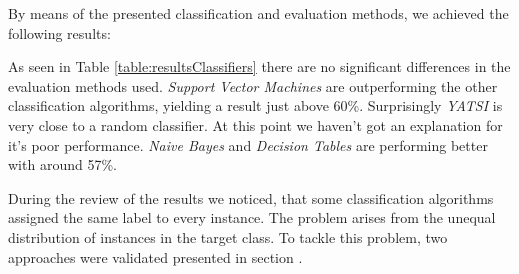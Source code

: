 By means of the presented classification and evaluation methods, we achieved the following results:
\begin{table}[h]
\label{table:resultsClassifiers}
\end{table}


As seen in Table \ref{table:resultsClassifiers} there are no significant differences in the evaluation methods used. 
\textit{Support Vector Machines} are outperforming the other classification algorithms, yielding a result just above 
60\%. Surprisingly \textit{YATSI} is very close to a random classifier. At this point we haven't got an explanation for 
it's poor performance. \textit{Naive Bayes} and \textit{Decision Tables} are performing better with around 57\%.



During the review of the results we noticed, that some classification algorithms assigned the same label to every 
instance. The problem arises from the unequal distribution of instances in the target class. To tackle this problem, 
two approaches were validated presented in section .


